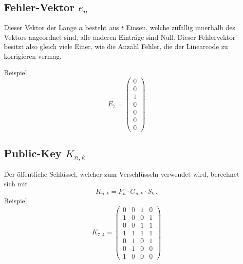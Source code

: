 \subsection{Fehler-Vektor $e_n$
\label{mceliece:subsection:p_m}}
Dieser Vektor der Länge $n$ besteht aus $t$ Einsen, welche zufällig innerhalb des Vektors angeordnet sind,
alle anderen Einträge sind Null.
Dieser Fehlervektor besitzt also gleich viele Einer,
wie die Anzahl Fehler, die der Linearcode zu korrigieren vermag.

Beispiel
\[
    E_7=
    \begin{pmatrix}
        0\\
        0\\
        1\\
        0\\
        0\\
        0\\
        0
    \end{pmatrix}
\]

\subsection{Public-Key $K_{n,k}$
\label{mceliece:subsection:k_m}}
Der öffentliche Schlüssel, welcher zum Verschlüsseln verwendet wird,
berechnet sich mit
\[
    K_{n,k}=P_{n}\cdot G_{n,k}\cdot S_{k}\,.
\]
Beispiel
\[
    K_{7,4}=
    \begin{pmatrix}
        0 & 0 & 1 & 0\\
        1 & 0 & 0 & 1\\
        0 & 0 & 1 & 1\\
        1 & 1 & 1 & 1\\
        0 & 1 & 0 & 1\\
        0 & 1 & 0 & 0\\
        1 & 0 & 0 & 0
    \end{pmatrix}
\]